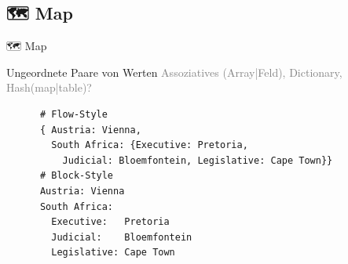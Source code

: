 \documentclass{beamer}
\begin{document}
\subsection{🗺 Map}

\begin{frame}[fragile]{🗺 Map}
  \begin{block}{Ungeordnete Paare von Werten}
    \textcolor{gray}{Assoziatives (Array|Feld), Dictionary, Hash(map|table)?}\\
    \begin{verbatim}
      # Flow-Style
      { Austria: Vienna,
        South Africa: {Executive: Pretoria,
          Judicial: Bloemfontein, Legislative: Cape Town}}
      # Block-Style
      Austria: Vienna
      South Africa:
        Executive:   Pretoria
        Judicial:    Bloemfontein
        Legislative: Cape Town
    \end{verbatim}
  \end{block}
\end{frame}
\end{document}
